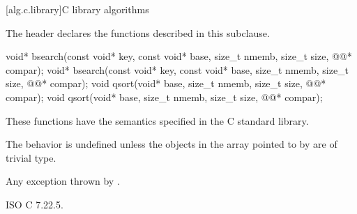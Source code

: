[alg.c.library]{C library algorithms}

\pnum
\begin{note}
The header 
declares the functions described in this subclause.
\end{note}

%
%
\begin{itemdecl}
void* bsearch(const void* key, const void* base, size_t nmemb, size_t size,
              @@* compar);
void* bsearch(const void* key, const void* base, size_t nmemb, size_t size,
              @@* compar);
void qsort(void* base, size_t nmemb, size_t size, @@* compar);
void qsort(void* base, size_t nmemb, size_t size, @@* compar);
\end{itemdecl}

\begin{itemdescr}
\pnum
\effects
These functions have the semantics specified in the C standard library.

\pnum
\remarks
The behavior is undefined
unless the objects in the array pointed to by  are of trivial type.

\pnum
\throws
Any exception thrown by .
\end{itemdescr}

\xref
ISO C 7.22.5.
